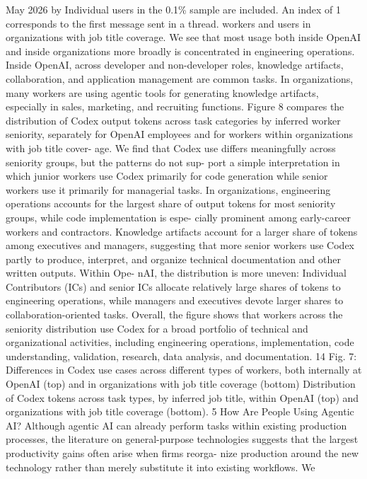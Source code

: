 May 2026 by Individual users in the 0.1\% sample are included. An index of 1 corresponds to the first message sent in a thread.
workers and users in organizations with job title coverage. We see that most usage both inside OpenAI
and inside organizations more broadly is concentrated in engineering operations. Inside OpenAI, across
developer and non-developer roles, knowledge artifacts, collaboration, and application management
are common tasks. In organizations, many workers are using agentic tools for generating knowledge
artifacts, especially in sales, marketing, and recruiting functions.
Figure 8 compares the distribution of Codex output tokens across task categories by inferred worker
seniority, separately for OpenAI employees and for workers within organizations with job title cover-
age. We find that Codex use differs meaningfully across seniority groups, but the patterns do not sup-
port a simple interpretation in which junior workers use Codex primarily for code generation while
senior workers use it primarily for managerial tasks. In organizations, engineering operations accounts
for the largest share of output tokens for most seniority groups, while code implementation is espe-
cially prominent among early-career workers and contractors. Knowledge artifacts account for a larger
share of tokens among executives and managers, suggesting that more senior workers use Codex partly
to produce, interpret, and organize technical documentation and other written outputs. Within Ope-
nAI, the distribution is more uneven: Individual Contributors (ICs) and senior ICs allocate relatively
large shares of tokens to engineering operations, while managers and executives devote larger shares to
collaboration-oriented tasks. Overall, the figure shows that workers across the seniority distribution use
Codex for a broad portfolio of technical and organizational activities, including engineering operations,
implementation, code understanding, validation, research, data analysis, and documentation.
14
Fig. 7: Differences in Codex use cases across different types of workers, both internally at
OpenAI (top) and in organizations with job title coverage (bottom)
Distribution of Codex tokens across task types, by inferred job title, within OpenAI (top) and organizations with job title
coverage (bottom).
5
How Are People Using Agentic AI?
Although agentic AI can already perform tasks within existing production processes, the literature on
general-purpose technologies suggests that the largest productivity gains often arise when firms reorga-
nize production around the new technology rather than merely substitute it into existing workflows. We
